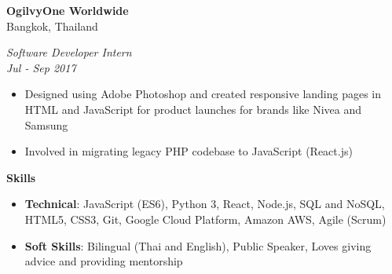 \documentclass[10pt,a4paper]{article}
\newcommand{\sectionheading}[1]{
  \vspace{14pt}
  \textbf{\Large #1}
  \vspace{6pt}
}
\newcommand{\subheadinginfo}[4]{
  \vspace{6pt}
  \noindent
  \begin{minipage}[t]{.5\textwidth}
    \textbf{#1} \\
    #2
  \end{minipage}%
  \begin{minipage}[t]{.5\textwidth}
    \raggedleft
    \textit{#3} \\
    \textit{#4}
  \end{minipage}
  \vspace{-4pt}
}
\newcommand{\listitem}[1]{
  \item #1 \vspace{-5pt}
}
\begin{document}
\begin{minipage}[t]{0.55\textwidth}
  \subheadinginfo
  {OgilvyOne Worldwide}
  {Bangkok, Thailand}
  {Software Developer Intern}
  {Jul - Sep 2017}

  \begin{itemize}
    \listitem{Designed using Adobe Photoshop and created responsive landing pages
    in HTML and JavaScript for product launches for brands like Nivea and Samsung}
    \listitem{Involved in migrating legacy PHP codebase to JavaScript (React.js)}
  \end{itemize}

  \sectionheading{Skills}

  \begin{itemize}
    \listitem{\textbf{Technical}: JavaScript (ES6), Python 3, React, Node.js, SQL and NoSQL,
    HTML5, CSS3, Git, Google Cloud Platform, Amazon AWS, Agile (Scrum)}
    \listitem{\textbf{Soft Skills}: Bilingual (Thai and English), Public Speaker, Loves giving advice and
    providing mentorship}
  \end{itemize}

\end{minipage}%
\end{document}
